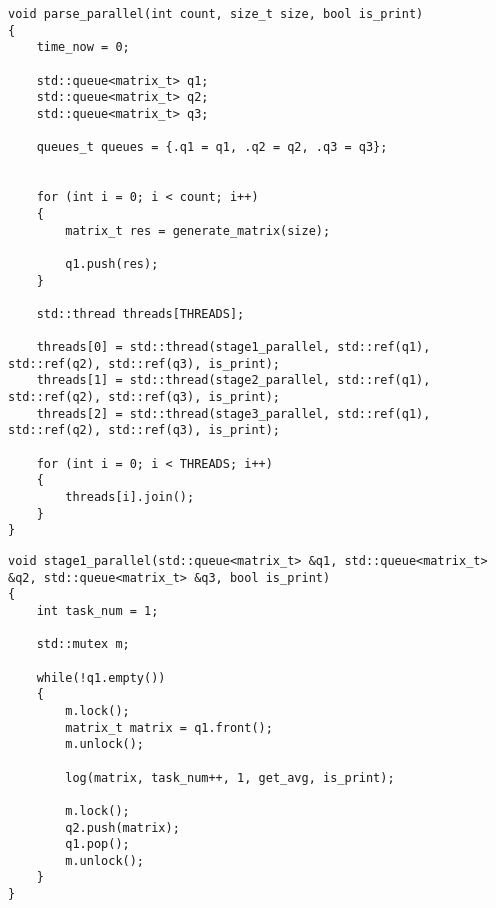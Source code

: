 \clearpage

\begin{center}
    \captionsetup{justification=raggedright,singlelinecheck=off}
    \begin{lstlisting}[label=lst:par_alg,caption=Алгоритм конвейерной обработки матрицы]
void parse_parallel(int count, size_t size, bool is_print)
{
	time_now = 0;

	std::queue<matrix_t> q1;
	std::queue<matrix_t> q2;
	std::queue<matrix_t> q3;

	queues_t queues = {.q1 = q1, .q2 = q2, .q3 = q3};

	
	for (int i = 0; i < count; i++)
	{
		matrix_t res = generate_matrix(size);
		
		q1.push(res);
	}

	std::thread threads[THREADS];

	threads[0] = std::thread(stage1_parallel, std::ref(q1), std::ref(q2), std::ref(q3), is_print);
	threads[1] = std::thread(stage2_parallel, std::ref(q1), std::ref(q2), std::ref(q3), is_print);
	threads[2] = std::thread(stage3_parallel, std::ref(q1), std::ref(q2), std::ref(q3), is_print);

	for (int i = 0; i < THREADS; i++)
	{
		threads[i].join();
	}
}
\end{lstlisting}
\end{center}


\clearpage


\begin{center}
    \captionsetup{justification=raggedright,singlelinecheck=off}
    \begin{lstlisting}[label=lst:no_par_alg,caption=Алгоритм запуска 1 потока для нахождения среднего арифметического элементов матрицы]
void stage1_parallel(std::queue<matrix_t> &q1, std::queue<matrix_t> &q2, std::queue<matrix_t> &q3, bool is_print)
{
	int task_num = 1;

	std::mutex m;

	while(!q1.empty())
	{      
		m.lock();
		matrix_t matrix = q1.front();
		m.unlock();

		log(matrix, task_num++, 1, get_avg, is_print);

		m.lock();
		q2.push(matrix);
		q1.pop();
		m.unlock();
	}
}
\end{lstlisting}
\end{center}

\clearpage

